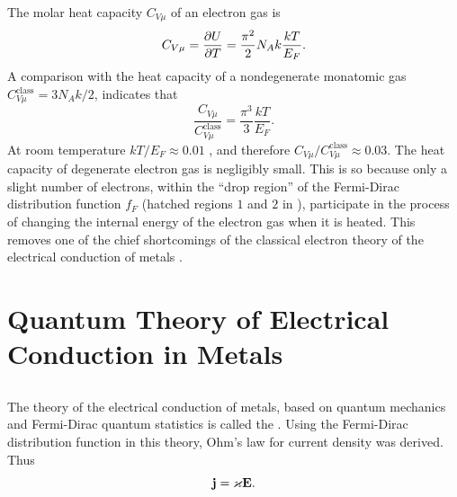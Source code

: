 The molar heat capacity $C_{V \mu}$  of an electron gas is 
\begin{equation*}%
C_{V\mu} =  \pdv{U}{T} = \frac{\pi^{2}}{2} N_{A}k \frac{kT}{E_{F}}.
\end{equation*}
A comparison with the heat capacity of a nondegenerate monatomic gas  $C^{\text{class}}_{V \mu} = 3 N_{A}k/2$, indicates that
\begin{equation*}%
\frac{C_{V\mu}}{C^{\text{class}}_{V \mu}} =   \frac{\pi^{3}}{3} \frac{kT}{E_{F}}.
\end{equation*}
At room temperature $kT/E_{F}  \approx 0.01$ , and therefore $C_{V\mu}/C^{\text{class}}_{V \mu} \approx 0.03$. The heat capacity of degenerate electron gas is negligibly small. This is so because only a slight number of electrons, within the ``drop region'' of the Fermi-Dirac distribution function $f_{F}$ (hatched regions $\mathit{1}$ and $\mathit{2}$ in ), participate in the process of changing the internal energy of the electron gas when it is heated. This removes one of the chief shortcomings of the classical electron theory of the electrical conduction of metals .

\section{Quantum Theory of Electrical Conduction in Metals}
\label{sec-41.5} 


\subsection{}\label{41.5.1} The theory of the electrical conduction of metals, based on quantum mechanics  and Fermi-Dirac quantum statistics
 is called the . Using the Fermi-Dirac distribution function  in this theory, Ohm's law for current density  was derived. Thus
\begin{equation*}%
\vb{j} = \varkappa \vb{E}.
\end{equation*}
